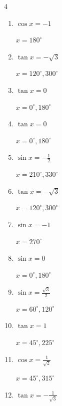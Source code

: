 \begin{multicols}{4}
\begin{enumerate}
  \item $\displaystyle \cos{x}  = -1$

        $\displaystyle x = 180^{\circ}$

  \item $\displaystyle \tan{x}  = -\sqrt{3}$

        $\displaystyle x = 120^{\circ} , 300^{\circ}$

  \item $\displaystyle \tan{x}  = 0$

        $\displaystyle x = 0^{\circ} , 180^{\circ}$

  \item $\displaystyle \tan{x}  = 0$

        $\displaystyle x = 0^{\circ} , 180^{\circ}$

  \item $\displaystyle \sin{x}  = -\frac{1}{2}$

        $\displaystyle x = 210^{\circ} , 330^{\circ}$

  \item $\displaystyle \tan{x}  = -\sqrt{3}$

        $\displaystyle x = 120^{\circ} , 300^{\circ}$

  \item $\displaystyle \sin{x}  = -1$

        $\displaystyle x = 270^{\circ}$

  \item $\displaystyle \sin{x}  = 0$

        $\displaystyle x = 0^{\circ} , 180^{\circ}$

  \item $\displaystyle \sin{x}  = \frac{\sqrt{3}}{2}$

        $\displaystyle x = 60^{\circ} , 120^{\circ}$

  \item $\displaystyle \tan{x}  = 1$

        $\displaystyle x = 45^{\circ} , 225^{\circ}$

\columnbreak %

\resetques

  \item $\displaystyle \cos{x}  = \frac{1}{\sqrt{2}}$

        $\displaystyle x = 45^{\circ} , 315^{\circ}$

  \item $\displaystyle \tan{x}  = -\frac{1}{\sqrt{3}}$


\end{enumerate}
\end{multicols}
